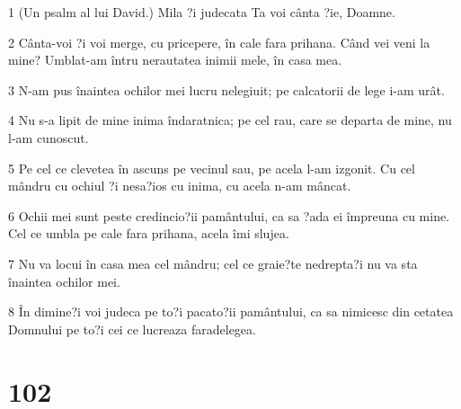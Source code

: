 \par 1 (Un psalm al lui David.) Mila ?i judecata Ta voi cânta ?ie, Doamne.
\par 2 Cânta-voi ?i voi merge, cu pricepere, în cale fara prihana. Când vei veni la mine? Umblat-am întru nerautatea inimii mele, în casa mea.
\par 3 N-am pus înaintea ochilor mei lucru nelegiuit; pe calcatorii de lege i-am urât.
\par 4 Nu s-a lipit de mine inima îndaratnica; pe cel rau, care se departa de mine, nu l-am cunoscut.
\par 5 Pe cel ce clevetea în ascuns pe vecinul sau, pe acela l-am izgonit. Cu cel mândru cu ochiul ?i nesa?ios cu inima, cu acela n-am mâncat.
\par 6 Ochii mei sunt peste credincio?ii pamântului, ca sa ?ada ei împreuna cu mine. Cel ce umbla pe cale fara prihana, acela îmi slujea.
\par 7 Nu va locui în casa mea cel mândru; cel ce graie?te nedrepta?i nu va sta înaintea ochilor mei.
\par 8 În dimine?i voi judeca pe to?i pacato?ii pamântului, ca sa nimicesc din cetatea Domnului pe to?i cei ce lucreaza faradelegea.

\chapter{102}

